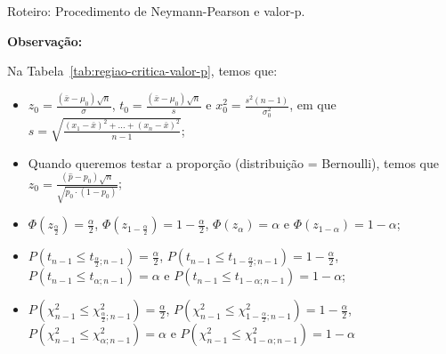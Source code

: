 \documentclass[8pt]{beamer}
\begin{document}
\begin{frame}{Roteiro: Procedimento de Neymann-Pearson e valor-p.}

\small

\textbf{Observação:}

Na Tabela~\ref{tab:regiao-critica-valor-p}, temos que:
\begin{itemize}
	\item $z_0 =\frac{(\bar{x} - \mu_0)\sqrt{n}}{\sigma}$, $t_0=\frac{(\bar{x} - \mu_0)\sqrt{n}}{s}$ e $x_0^2 = \frac{s^2 (n-1)}{\sigma_0^2}$, em que $s = \sqrt{ \frac{(x_1- \bar{x})^2+ \dots + (x_n- \bar{x})^2}{n-1} }$;
	\vfill
	
	\item  Quando queremos testar a proporção (distribuição = Bernoulli), temos que $z_0 =\frac{(\hat{p} - p_0)\sqrt{n}}{\sqrt{p_0 \cdot (1 - p_0)}}$;
	\vfill
	
	\item $\Phi\left(z_\frac{\alpha}{2}\right)=\frac{\alpha}{2}$, $\Phi\left(z_{1-\frac{\alpha}{2}}\right)=1-\frac{\alpha}{2}$, $\Phi\left(z_\alpha\right)=\alpha$ e $\Phi\left(z_{1-\alpha}\right)=1-\alpha$;
	\vfill
	
	\item $P\left(t_{n-1} \leq t_{\frac{\alpha}{2}; n-1} \right) = \frac{\alpha}{2}$, $P\left(t_{n-1} \leq t_{1-\frac{\alpha}{2}; n-1} \right) = 1- \frac{\alpha}{2}$, $P\left(t_{n-1} \leq t_{\alpha; n-1} \right) = \alpha$ e $P\left(t_{n-1} \leq t_{1-\alpha; n-1} \right) = 1-\alpha$;
	\vfill
	
	\item $P\left( \chi_{n-1}^2 \leq \chi_{\frac{\alpha}{2};n-1}^2 \right)=\frac{\alpha}{2}$, $P\left( \chi_{n-1}^2 \leq \chi_{1-\frac{\alpha}{2};n-1}^2 \right)=1-\frac{\alpha}{2}$, $P\left( \chi_{n-1}^2 \leq \chi_{\alpha;n-1}^2 \right)=\alpha$ e $P\left( \chi_{n-1}^2 \leq \chi_{1- \alpha;n-1}^2 \right)=1- \alpha$
\end{itemize}

\normalsize 

\end{frame}
\end{document}
